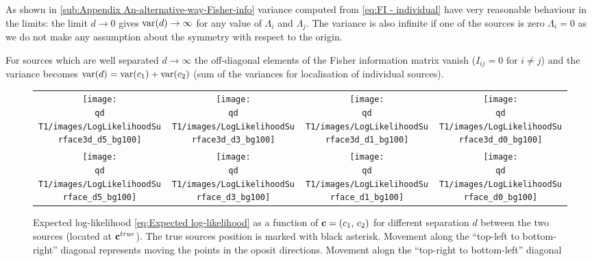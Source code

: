 As shown in \autoref{sub:Appendix An-alternative-way-Fisher-info} variance computed from \autoref{eq:FI - individual} have very reasonable behaviour in the limits: the limit $d\rightarrow0$ gives $\mathrm{var}(d)\rightarrow\infty$ for any value of $\Lambda_i$ and $\Lambda_j$. The variance is also infinite if one of the sources is zero $\Lambda_i=0$ as we do not make any assumption about the symmetry with respect to the origin. 

For sources which are well separated $d\rightarrow\infty$ the off-diagonal elements of the Fisher information matrix vanish ($I_{ij}=0\text{ for }i\neq j$) and the variance becomes $\mathrm{var}(d)=\mathrm{var}(c_1)+\mathrm{var}(c_2)$ (sum of the variances for localisation of individual sources).

\begin{figure}[!h]
	\centering
	\newcommand{\sizeff}{.18}
	\newcommand{\sizegg}{.16}	
	\begin{tabular}{cccc}
		\subfloat[$d=5$]{\texttt{[image: \\qd T1/images/LogLikelihoodSurface3d\_d5\_bg100]}} 
		
		& \subfloat[$d=3$]{\texttt{[image: \\qd T1/images/LogLikelihoodSurface3d\_d3\_bg100]}}
		
		& \subfloat[$d=1$]{\texttt{[image: \\qd T1/images/LogLikelihoodSurface3d\_d1\_bg100]}}
		
		& \subfloat[$d=0$]{\texttt{[image: \\qd T1/images/LogLikelihoodSurface3d\_d0\_bg100]}}
		
		\tabularnewline
		\subfloat[$d=5$]{\texttt{[image: \\qd T1/images/LogLikelihoodSurface\_d5\_bg100]}}
		
		& \subfloat[$d=3$]{\texttt{[image: \\qd T1/images/LogLikelihoodSurface\_d3\_bg100]}}
		
		& \subfloat[$d=1$]{\texttt{[image: \\qd T1/images/LogLikelihoodSurface\_d1\_bg100]}}
		
		& \subfloat[$d=0$]{\texttt{[image: \\qd T1/images/LogLikelihoodSurface\_d0\_bg100]}}
		
		\tabularnewline
	\end{tabular}

	\caption{Expected log-likelihood \autoref{eq:Expected log-likelihood} as a function of ${\bf c}=(c_{\text{1}},\, c_2)$ for different separation $d$ between the two sources (located at ${\bf c}^{true}$). The true sources position is marked with black asterisk. Movement along the ``top-left to bottom-right'' diagonal represents moving the points in the oposit directions. Movement alogn the ``top-right to bottom-left'' diagonal 
	\label{fig:Expected-log-likelihood-Surface}}
\end{figure}

